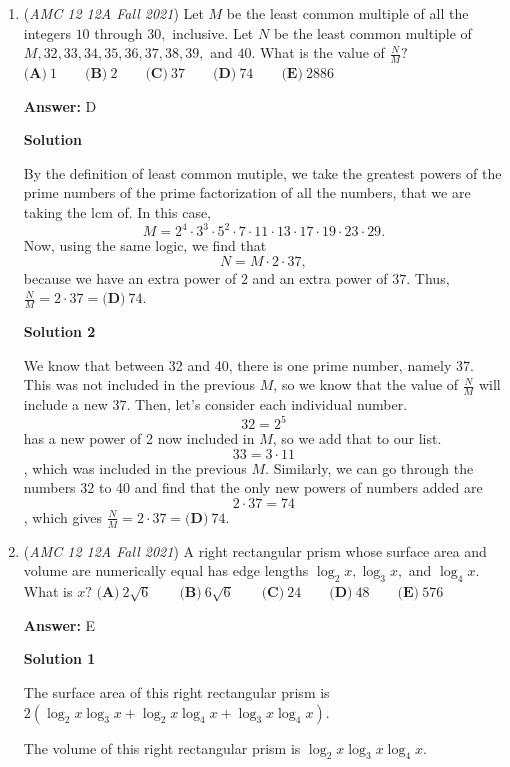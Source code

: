 \begin{enumerate}
	\item (\textit{AMC 12 12A Fall 2021}) Let $M$ be the least common multiple of all the integers $10$ through $30,$ inclusive. Let $N$ be the least common multiple of $M,32,33,34,35,36,37,38,39,$ and $40.$ What is the value of $\frac{N}{M}?$
$\textbf{(A)}\ 1 \qquad\textbf{(B)}\ 2 \qquad\textbf{(C)}\ 37 \qquad\textbf{(D)}\ 74 \qquad\textbf{(E)}\ 2886$

 \textbf{Answer: }D



\textbf{Solution}

By the definition of least common mutiple, we take the greatest powers of the prime numbers of the prime factorization of all the numbers, that we are taking the $\text{lcm}$ of. In this case, 
 \[M = 2^4 \cdot 3^3 \cdot 5^2 \cdot 7 \cdot 11 \cdot 13 \cdot 17 \cdot 19 \cdot 23 \cdot 29.\] Now, using the same logic, we find that 
 \[N = M \cdot 2 \cdot 37,\] because we have an extra power of $2$ and an extra power of $37.$ Thus, $\frac{N}{M} = 2\cdot 37 = \boxed{\textbf{(D)}\ 74}.$




\textbf{Solution 2}

We know that between 32 and 40, there is one prime number, namely $37$. This was not included in the previous $M$, so we know that the value of $\frac{N}{M}$ will include a new 37. Then, let’s consider each individual number. 
 \[32 = 2^5\] has a new power of 2 now included in $M$, so we add that to our list. 
 \[33=3 \cdot 11\], which was included in the previous $M$. Similarly, we can go through the numbers 32 to 40 and find that the only new powers of numbers added are 
 \[2 \cdot 37 = 74\], which gives $\frac{N}{M} = 2\cdot 37 = \boxed{\textbf{(D)}\ 74}.$



	\item (\textit{AMC 12 12A Fall 2021}) A right rectangular prism whose surface area and volume are numerically equal has edge lengths $\log_{2}x, \log_{3}x,$ and $\log_{4}x.$ What is $x?$
$\textbf{(A)}\ 2\sqrt{6} \qquad\textbf{(B)}\ 6\sqrt{6} \qquad\textbf{(C)}\ 24 \qquad\textbf{(D)}\ 48 \qquad\textbf{(E)}\ 576$

 \textbf{Answer: }E



\textbf{Solution 1}

The surface area of this right rectangular prism is $2(\log_{2}x\log_{3}x+\log_{2}x\log_{4}x+\log_{3}x\log_{4}x).$

 The volume of this right rectangular prism is $\log_{2}x\log_{3}x\log_{4}x.$


\end{enumerate}

